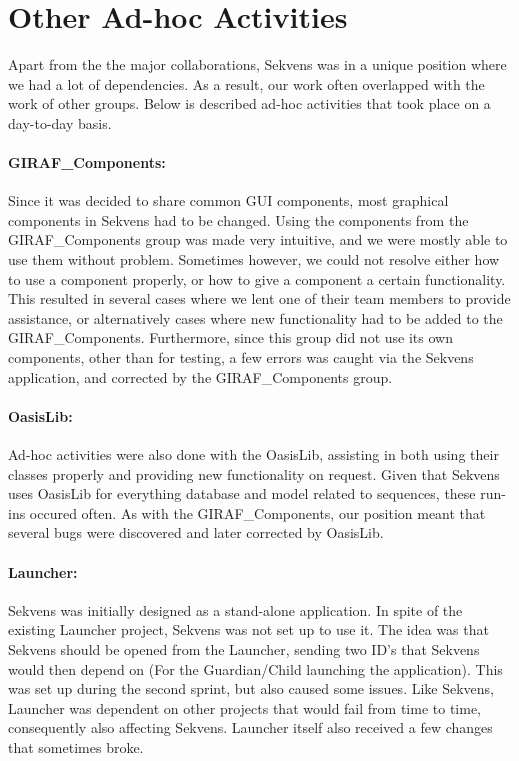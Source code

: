 \section{Other Ad-hoc Activities}\label{sec:adhoc}
Apart from the the major collaborations, Sekvens was in a unique position where we had a lot of dependencies. As a result, our work often overlapped with the work of other groups. Below is described ad-hoc activities that took place on a day-to-day basis.

\paragraph{GIRAF\_Components:}
Since it was decided to share common GUI components, most graphical components in Sekvens had to be changed. Using the components from the GIRAF\_Components group was made very intuitive, and we were mostly able to use them without problem. Sometimes however, we could not resolve either how to use a component properly, or how to give a component a certain functionality. This resulted in several cases where we lent one of their team members to provide assistance, or alternatively cases where new functionality had to be added to the GIRAF\_Components.  Furthermore, since this group did not use its own components, other than for testing, a few errors was caught via the Sekvens application, and corrected by the GIRAF\_Components group.

\paragraph{OasisLib:}
Ad-hoc activities were also done with the OasisLib, assisting in both using their classes properly and providing new functionality on request. Given that Sekvens uses OasisLib for everything database and model related to sequences, these run-ins occured often. As with the GIRAF\_Components, our position meant that several bugs were discovered and later corrected by OasisLib.

\paragraph{Launcher:}
Sekvens was initially designed as a stand-alone application. In spite of the existing Launcher project, Sekvens was not set up to use it. The idea was that Sekvens should be opened from the Launcher, sending two ID's that Sekvens would then depend on (For the Guardian/Child launching the application). This was set up during the second sprint, but also caused some issues. Like Sekvens, Launcher was dependent on other projects that would fail from time to time, consequently also affecting Sekvens. Launcher itself also received a few changes that sometimes broke.

